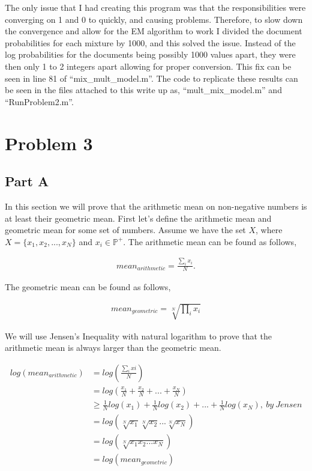 \documentclass[paper=a4, fontsize=11pt]{scrartcl} %
\begin{document}
The only issue that I had creating this program was that the responsibilities were converging on 1 and 0 to quickly, and causing problems.  
Therefore, to slow down the convergence and allow for the EM algorithm to work I divided the document probabilities for each mixture by 1000, and this solved the issue.  
Instead of the log probabilities for the documents being possibly 1000 values apart, they were then only 1 to 2 integers apart allowing for proper conversion.  
This fix can be seen in line 81 of ``mix\_mult\_model.m''.
The code to replicate these results can be seen in the files attached to this write up as, ``mult\_mix\_model.m'' and ``RunProblem2.m''.



\section{Problem 3}

\subsection{Part A}
In this section we will prove that the arithmetic mean on non-negative numbers is at least their geometric mean.
First let's define the arithmetic mean and geometric mean for some set of numbers.  
Assume we have the set $X$, where $X = \{x_1,x_2,...,x_N\} $ and $ x_i \in \mathbb{P}^+$.
The arithmetic mean can be found as follows, 

\begin{align}
mean_{arithmetic} = \frac{\sum_i x_i}{N}.
\end{align}

The geometric mean can be found as follows,

\begin{align}
mean_{geometric} = \sqrt[N]{\prod_i x_i}
\end{align}

We will use Jensen's Inequality with natural logarithm to prove that the arithmetic mean is always larger than the geometric mean.

\begin{align}
log(mean_{arithmetic}) &= log(\frac{\sum_i xi}{N}) \\
&= log(\frac{x_1}{N}+\frac{x_2}{N}+...+\frac{x_N}{N}) \\
&\ge \frac{1}{N}log(x_1)+\frac{1}{N}log(x_2)+...+\frac{1}{N}log(x_N), \ by \  Jensen \\
&= log(\sqrt[N]{x_1}\sqrt[N]{x_2}...\sqrt[N]{x_N}) \\
&=log(\sqrt[N]{x_1x_2...x_N}) \\
&= log(mean_{geometric})
\end{align}
\end{document}
